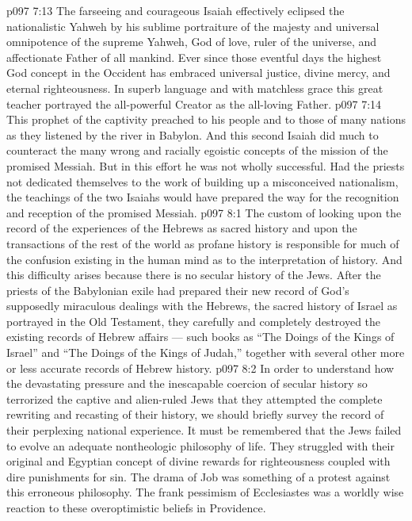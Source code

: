 \vs p097 7:13 The farseeing and courageous Isaiah effectively eclipsed the nationalistic Yahweh by his sublime portraiture of the majesty and universal omnipotence of the supreme Yahweh, God of love, ruler of the universe, and affectionate Father of all mankind. Ever since those eventful days the highest God concept in the Occident has embraced universal justice, divine mercy, and eternal righteousness. In superb language and with matchless grace this great teacher portrayed the all\hyp{}powerful Creator as the all\hyp{}loving Father.
\vs p097 7:14 This prophet of the captivity preached to his people and to those of many nations as they listened by the river in Babylon. And this second Isaiah did much to counteract the many wrong and racially egoistic concepts of the mission of the promised Messiah. But in this effort he was not wholly successful. Had the priests not dedicated themselves to the work of building up a misconceived nationalism, the teachings of the two Isaiahs would have prepared the way for the recognition and reception of the promised Messiah.
\vs p097 8:1 The custom of looking upon the record of the experiences of the Hebrews as sacred history and upon the transactions of the rest of the world as profane history is responsible for much of the confusion existing in the human mind as to the interpretation of history. And this difficulty arises because there is no secular history of the Jews. After the priests of the Babylonian exile had prepared their new record of God’s supposedly miraculous dealings with the Hebrews, the sacred history of Israel as portrayed in the Old Testament, they carefully and completely destroyed the existing records of Hebrew affairs --- such books as “The Doings of the Kings of Israel” and “The Doings of the Kings of Judah,” together with several other more or less accurate records of Hebrew history.
\vs p097 8:2 In order to understand how the devastating pressure and the inescapable coercion of secular history so terrorized the captive and alien\hyp{}ruled Jews that they attempted the complete rewriting and recasting of their history, we should briefly survey the record of their perplexing national experience. It must be remembered that the Jews failed to evolve an adequate nontheologic philosophy of life. They struggled with their original and Egyptian concept of divine rewards for righteousness coupled with dire punishments for sin. The drama of Job was something of a protest against this erroneous philosophy. The frank pessimism of Ecclesiastes was a worldly wise reaction to these overoptimistic beliefs in Providence.
